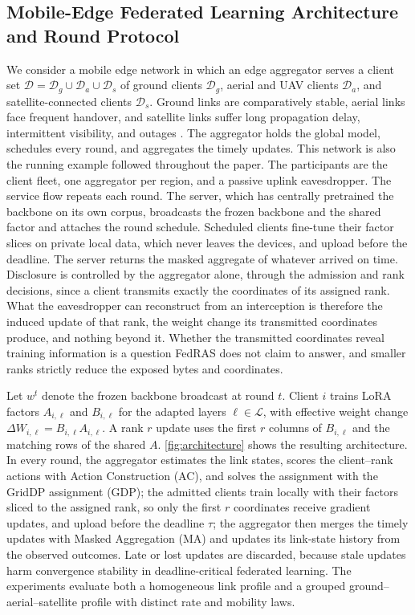 \documentclass[a4paper,fleqn]{cas-dc}
\begin{document}
\subsection{Mobile-Edge Federated Learning Architecture and Round Protocol}
We consider a mobile edge network in which an edge aggregator serves a client set
$\mathcal{D}=\mathcal{D}_g\cup\mathcal{D}_a\cup\mathcal{D}_s$ of ground clients $\mathcal{D}_g$, aerial and UAV clients $\mathcal{D}_a$, and satellite-connected clients $\mathcal{D}_s$. Ground links are comparatively stable, aerial links face frequent handover, and satellite links suffer long propagation delay, intermittent visibility, and outages \cite{mahboob2024ntn,razmi2022ground}. The aggregator holds the global model, schedules every round, and aggregates the timely updates. This network is also the running example followed throughout the paper. The participants are the client fleet, one aggregator per region, and a passive uplink eavesdropper. The service flow repeats each round. The server, which has centrally pretrained the backbone on its own corpus, broadcasts the frozen backbone and the shared factor and attaches the round schedule. Scheduled clients fine-tune their factor slices on private local data, which never leaves the devices, and upload before the deadline. The server returns the masked aggregate of whatever arrived on time. Disclosure is controlled by the aggregator alone, through the admission and rank decisions, since a client transmits exactly the coordinates of its assigned rank. What the eavesdropper can reconstruct from an interception is therefore the induced update of that rank, the weight change its transmitted coordinates produce, and nothing beyond it. Whether the transmitted coordinates reveal training information is a question FedRAS does not claim to answer, and smaller ranks strictly reduce the exposed bytes and coordinates.
\par
Let $w^t$ denote the frozen backbone broadcast at round $t$. Client $i$ trains LoRA factors $A_{i,\ell}$ and $B_{i,\ell}$ for the adapted layers $\ell\in\mathcal L$, with effective weight change $\Delta W_{i,\ell}=B_{i,\ell}A_{i,\ell}$. A rank $r$ update uses the first $r$ columns of $B_{i,\ell}$ and the matching rows of the shared $A$. \cref{fig:architecture} shows the resulting architecture. In every round, the aggregator estimates the link states, scores the client--rank actions with Action Construction (AC), and solves the assignment with the GridDP assignment (GDP); the admitted clients train locally with their factors sliced to the assigned rank, so only the first $r$ coordinates receive gradient updates, and upload before the deadline $\tau$; the aggregator then merges the timely updates with Masked Aggregation (MA) and updates its link-state history from the observed outcomes. Late or lost updates are discarded, because stale updates harm convergence stability in deadline-critical federated learning. The experiments evaluate both a homogeneous link profile and a grouped ground--aerial--satellite profile with distinct rate and mobility laws.
\par
\end{document}

